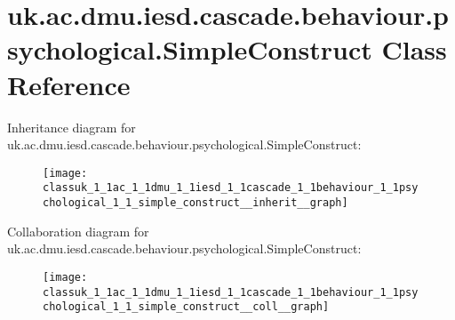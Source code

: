 \hypertarget{classuk_1_1ac_1_1dmu_1_1iesd_1_1cascade_1_1behaviour_1_1psychological_1_1_simple_construct}{\section{uk.\-ac.\-dmu.\-iesd.\-cascade.\-behaviour.\-psychological.\-Simple\-Construct Class Reference}
\label{classuk_1_1ac_1_1dmu_1_1iesd_1_1cascade_1_1behaviour_1_1psychological_1_1_simple_construct}
}


Inheritance diagram for uk.\-ac.\-dmu.\-iesd.\-cascade.\-behaviour.\-psychological.\-Simple\-Construct\-:\nopagebreak
\begin{figure}[H]
\begin{center}
\leavevmode
\texttt{[image: classuk\_1\_1ac\_1\_1dmu\_1\_1iesd\_1\_1cascade\_1\_1behaviour\_1\_1psychological\_1\_1\_simple\_construct\_\_inherit\_\_graph]}
\end{center}
\end{figure}


Collaboration diagram for uk.\-ac.\-dmu.\-iesd.\-cascade.\-behaviour.\-psychological.\-Simple\-Construct\-:\nopagebreak
\begin{figure}[H]
\begin{center}
\leavevmode
\texttt{[image: classuk\_1\_1ac\_1\_1dmu\_1\_1iesd\_1\_1cascade\_1\_1behaviour\_1\_1psychological\_1\_1\_simple\_construct\_\_coll\_\_graph]}
\end{center}
\end{figure}
